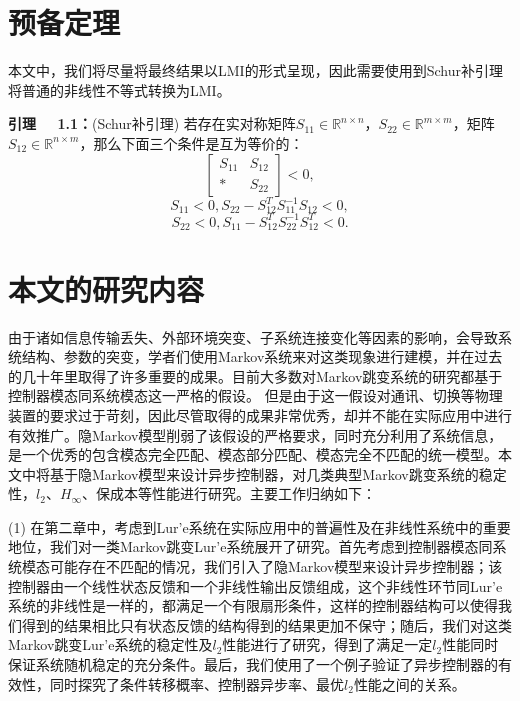 \section{预备定理}
	本文中，我们将尽量将最终结果以LMI的形式呈现，因此需要使用到Schur补引理将普通的非线性不等式转换为LMI。
	
	{\bf 引理 \ \ 1.1：}(Schur补引理\cite{boyd1994linear}) 若存在实对称矩阵$S_{11}\in\mathbb{R}^{n\times n}$，$S_{22}\in\mathbb{R}^{m\times m}$，矩阵$S_{12}\in\mathbb{R}^{n\times m}$，那么下面三个条件是互为等价的：
	\begin{equation}
		\begin{bmatrix}
			S_{11}&S_{12}\\
			*&S_{22}
		\end{bmatrix}<0,
	\end{equation} 
	\begin{equation}
		S_{11}<0,S_{22}-S^{T}_{12}S^{-1}_{11}S_{12}<0,
	\end{equation} 
	\begin{equation}
		S_{22}<0,S_{11}-S^{T}_{12}S^{-1}_{22}S^{T}_{12}<0.
	\end{equation} 
		
\section{本文的研究内容}
	由于诸如信息传输丢失、外部环境突变、子系统连接变化等因素的影响，会导致系统结构、参数的突变，学者们使用Markov系统来对这类现象进行建模，并在过去的几十年里取得了许多重要的成果。目前大多数对Markov跳变系统的研究都基于控制器模态同系统模态这一严格的假设。 但是由于这一假设对通讯、切换等物理装置的要求过于苛刻，因此尽管取得的成果非常优秀，却并不能在实际应用中进行有效推广。隐Markov模型削弱了该假设的严格要求，同时充分利用了系统信息，是一个优秀的包含模态完全匹配、模态部分匹配、模态完全不匹配的统一模型。本文中将基于隐Markov模型来设计异步控制器，对几类典型Markov跳变系统的稳定性，$l_2$、$H_\infty$、保成本等性能进行研究。主要工作归纳如下：
	
	(1) 在第二章中，考虑到Lur'e系统在实际应用中的普遍性及在非线性系统中的重要地位，我们对一类Markov跳变Lur'e系统展开了研究。首先考虑到控制器模态同系统模态可能存在不匹配的情况，我们引入了隐Markov模型来设计异步控制器；该控制器由一个线性状态反馈和一个非线性输出反馈组成，这个非线性环节同Lur'e系统的非线性是一样的，都满足一个有限扇形条件，这样的控制器结构可以使得我们得到的结果相比只有状态反馈的结构得到的结果更加不保守；随后，我们对这类Markov跳变Lur'e系统的稳定性及$l_2$性能进行了研究，得到了满足一定$l_2$性能同时保证系统随机稳定的充分条件。最后，我们使用了一个例子验证了异步控制器的有效性，同时探究了条件转移概率、控制器异步率、最优$l_2$性能之间的关系。
	
